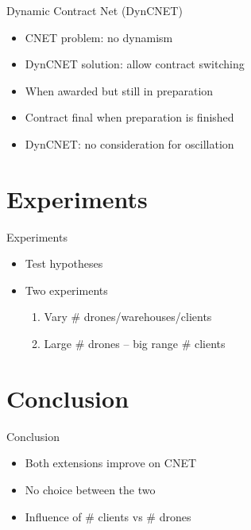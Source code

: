 \documentclass{beamer}
\begin{document}
	\begin{frame}{Dynamic Contract Net (DynCNET)}
		\begin{itemize}
			\item CNET problem: no dynamism
			\item DynCNET solution: allow contract switching
			\item When awarded but still in preparation
			\item Contract final when preparation is finished
			\item DynCNET: no consideration for oscillation
		\end{itemize}
	\end{frame}
	

	
	\section{Experiments}
	\begin{frame}{Experiments}
		\begin{itemize}
			\item Test hypotheses
			\item Two experiments
			\begin{enumerate}
				\item Vary \# drones/warehouses/clients
				\item Large \# drones -- big range \# clients
			\end{enumerate}
		\end{itemize}
	\end{frame}
	
	\section{Conclusion}
	\begin{frame}{Conclusion}
		\begin{itemize}
			\item Both extensions improve on CNET
			\item No choice between the two
			\item Influence of \# clients vs \# drones
		\end{itemize}
	\end{frame}
	
\end{document}
